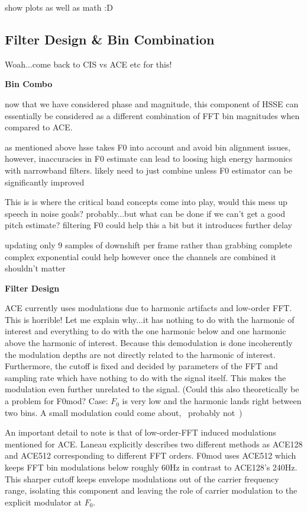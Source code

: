 \documentclass [11pt, proquest] {uwthesis}[2015/03/03]
\begin{document}
show plots as well as math :D

\subsection{Filter Design \& Bin Combination}

Woah...come back to CIS vs ACE etc for this!

\textbf{Bin Combo}

now that we have considered phase and magnitude, this component of HSSE can essentially be considered as a different combination of FFT bin magnitudes when compared to ACE.

as mentioned above hsse takes F0 into account and avoid bin alignment issues, however, inaccuracies in F0 estimate can lead to loosing high energy harmonics with narrowband filters.  likely need to just combine unless F0 estimator can be significantly improved

This is is where the critical band concepts come into play, would this mess up speech in noise goals? probably...but what can be done if we can't get a good pitch estimate?  filtering F0 could help this a bit but it introduces further delay

updating only 9 samples of downshift per frame rather than grabbing complete complex exponential could help however once the channels are combined it shouldn't matter

\textbf{Filter Design}

ACE currently uses modulations due to harmonic artifacts and low-order FFT.  This is horrible!  Let me explain why...it has nothing to do with the harmonic of interest and everything to do with the one harmonic below and one harmonic above the harmonic of interest.  Because this demodulation is done incoherently the modulation depths are not directly related to the harmonic of interest.  Furthermore, the cutoff is fixed and decided by parameters of the FFT and sampling rate which have nothing to do with the signal itself.  This makes the modulation even further unrelated to the signal.  (Could this also theoretically be a problem for F0mod?  Case: $F_0$ is very low and the harmonic lands right between two bins.  A small modulation could come about, ~probably not~)

An important detail to note is that of low-order-FFT induced modulations mentioned for ACE.  Laneau explicitly describes two different methods as ACE128 and ACE512 corresponding to different FFT orders.  F0mod uses ACE512 which keeps FFT bin modulations below roughly 60Hz in contrast to ACE128's 240Hz.  This sharper cutoff keeps envelope modulations out of the carrier frequency range, isolating this component and leaving the role of carrier modulation to the explicit modulator at $F_0$.
\end{document}
